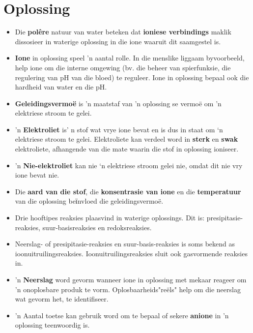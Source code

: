 {{            \section{Oplossing}
            \nopagebreak
            \label{m38719*eip-903}\begin{itemize}[noitemsep]
            \label{m38719*uid95}\item Die \textbf{pol\^{e}re} natuur van water beteken dat \textbf{ioniese verbindings} maklik dissosieer in waterige oplossing in die ione waaruit dit saamgestel is. 
\label{m38719*uid96}\item \textbf{Ione} in oplossing speel 'n aantal rolle. In die menslike liggaam byvoorbeeld, help ione om die interne omgewing (bv. die beheer van spierfunksie, die regulering van pH van die bloed) te reguleer. Ione in oplossing bepaal ook die hardheid van water en die pH. 
\label{m38719*uid100}\item \textbf{Geleidingsvermo\"{e}} is 'n maatstaf van 'n oplossing se vermoë om 'n elektriese stroom te gelei.
\label{m38719*uid101}\item 'n \textbf{Elektroliet} is' n stof wat vrye ione bevat en is dus in staat om ‘n elektriese stroom te gelei. Elektroliete kan verdeel word in \textbf{sterk} en \textbf{swak} elektroliete, afhangende van die mate waarin die stof in oplossing ioniseer.
\label{m38719*uid102}\item 'n \textbf{Nie-elektroliet} kan nie ‘n elektriese stroom gelei nie, omdat dit nie vry ione bevat nie.
\label{m38719*uid103}\item Die \textbf{aard van die stof}, die \textbf{konsentrasie van ione} en die \textbf{temperatuur} van die oplossing beїnvloed die geleidingsvermo\"{e}.
\label{m38719*uid0253}\item Drie hooftipes reaksies plaasvind in waterige oplossings. Dit is: presipitasie-reaksies, suur-basisreaksies en redoksreaksies.
\label{m38719*uid8923}\item Neerslag- of presipitasie-reaksies en suur-basis-reaksies is soms bekend as ioonuitruilingsreaksies. Ioonuitruilingsreaksies sluit ook gasvormende reaksies in.
\label{m38719*uid104}\item 'n \textbf{Neerslag} word gevorm wanneer ione in oplossing met mekaar reageer om 'n onoplosbare produk te vorm. Oplosbaarheids"re\"{e}ls" help om die neerslag wat gevorm het, te identifiseer.
\label{m38719*uid105}\item 'n Aantal toetse kan gebruik word om te bepaal of sekere \textbf{anione} in 'n oplossing teenwoordig is.

\end{itemize}}}
